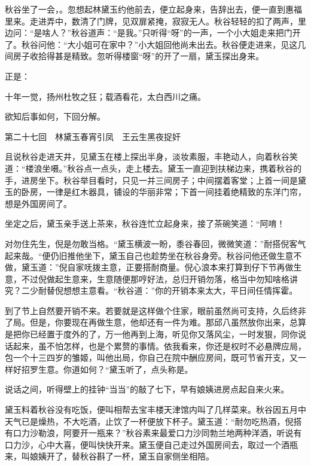\documentclass[12pt,UTF8]{ctexbook}
\begin{document}
{{{秋谷坐了一会，。忽想起林黛玉约他前去，便立起身来，告辞出去，便一直到惠福里来。走进弄中，数清了门牌，见双扉紧掩，寂寂无人。秋谷轻轻的扣了两声，里边问：“是啥人？”秋谷道声：“是我。”只听得“呀”的一声，一个小大姐走来把门开了。秋谷问他：“大小姐可在家中？”小大姐回他尚未出去。秋谷便走进来，见这几间房子收拾得甚是精致。忽听得楼窗“呀”的开了一扇，黛玉探出身来。

正是：

十年一觉，扬州杜牧之狂；载酒看花，太白西川之痛。

欲知后事如何，下回分解。





第二十七回　林黛玉春宵引凤　王云生黑夜捉奸





且说秋谷走进天井，见黛玉在楼上探出半身，淡妆素服，丰艳动人，向着秋谷笑道：“楼浪坐嗫。”秋谷点一点头，走上楼去。黛玉一直迎到扶梯边来，携着秋谷的手，进房坐下。秋谷举目看时，只见一并三间房子；中间摆着客堂；上首一间是黛玉的卧房，一律是红木器具，铺设的华丽非常；下首一间挂着绝精致的东洋门帘，想是外国房间了。

坐定之后，黛玉亲手送上茶来，秋谷连忙立起身来，接了茶碗笑道：“阿唷！

对勿住先生，倪是勿敢当格。“黛玉横波一盼，黍谷春回，微微笑道：”耐搭倪客气起来哉。“便仍旧推他坐下，黛玉自己也趁势坐在秋谷身旁。秋谷问他还做生意不做，黛玉道：”倪自家呒拨主意，正要搭耐商量。倪心浪本来打算到仔下节再做生意，不过倪做起生意来，生意随便那哼好法，总归开销勿落，格当中勿知啥格讲究？二少耐替倪想想主意看。“秋谷道：”你的开销本来太大，平日间任情挥霍。

到了节上自然要开销不来。若要就是这样做个住家，眼前虽然尚可支持，久后终非了局。但是，你要现在再做生意，他却还有一件为难。那邱八虽然放你出来，总算是把你已经置于度外的了，万一他再到上海，听见你又落风尘，一时发狠，同你说话起来，虽不怕怎样，也是个累赘的事情。依我看来，你还是权时不必悬牌应局，包一个十三四岁的雏姬，叫他出局，你自己在院中酬应房间，既可节省开支，又一样好招罗生意。你道如何？“黛玉听了，点头称是。

说话之间，听得壁上的挂钟“当当”的敲了七下，早有娘姨进房点起自来火来。

黛玉料着秋谷没有吃饭，便叫相帮去宝丰楼天津馆内叫了几样菜来。秋谷因五月中天气已是燥热，不大吃酒，止饮了一杯便放下杯子。黛玉道：“耐勿吃热酒，倪搭有口力沙勒浪，阿要开一瓶来？”秋谷素来最爱口力沙同勃兰地两种洋酒，听说有口力沙，心中大喜，便叫快快开来。黛玉便自己走过外国房间去，取过一个酒瓶来，叫娘姨开了，替秋谷斟了一杯，黛玉自家侧坐相陪。

}}}
\end{document}
